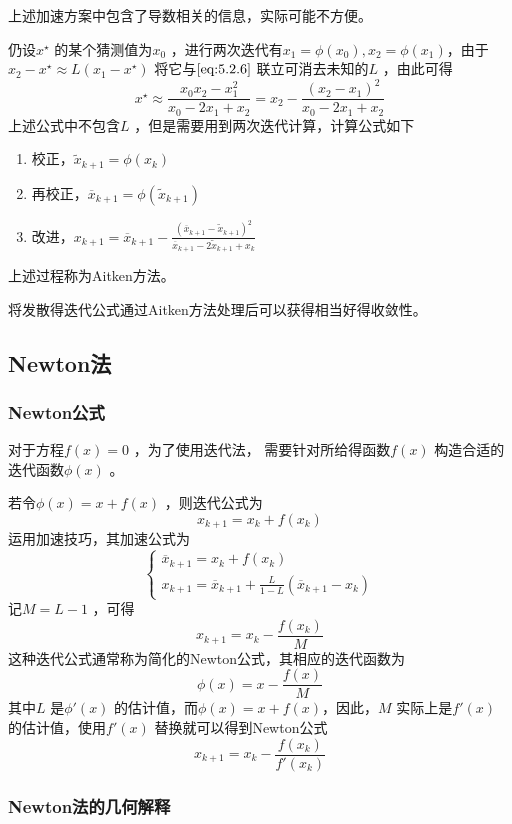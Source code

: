 \documentclass[a4paper]{article}
\begin{document}
上述加速方案中包含了导数相关的信息，实际可能不方便。

仍设$x^{\star}$ 的某个猜测值为$x_0$ ，进行两次迭代有$x_1 = \phi(x_0), x_2 = \phi(x_1)$，由于$x_2 - x^{\star} \approx L (x_1 - x^{\star})$ 将它与$\ref{eq:5.2.6}$ 联立可消去未知的$L$ ，由此可得
\[
x^{\star} \approx \frac{x_0 x_2 - x_1^2}{x_0 - 2 x_1 + x_2} = x_2 - \frac{(x_2 - x_1)^2}{x_0 - 2 x_1 + x_2}
\] 
上述公式中不包含$L$ ，但是需要用到两次迭代计算，计算公式如下
\begin{enumerate}
	\item 校正，$\tilde{x}_{k+1} = \phi(x_{k})$
	\item 再校正，$\overline{x}_{k+1} = \phi(\tilde{x}_{k+1})$
	\item 改进，$x_{k+1} = \overline{x}_{k+1} - \frac{(\overline{x}_{k+1} - \tilde{x}_{k+1})^2}{\overline{x}_{k+1} - 2 \tilde{x}_{k+1} + x_{k}}$
\end{enumerate}
上述过程称为Aitken方法。

将发散得迭代公式通过Aitken方法处理后可以获得相当好得收敛性。

\subsection{Newton法}
\subsubsection{Newton公式}
对于方程$f(x) = 0$ ，为了使用迭代法， 需要针对所给得函数$f(x)$ 构造合适的迭代函数$\phi(x)$ 。

若令$\phi(x) = x + f(x)$ ，则迭代公式为
\[
x_{k+1} = x_{k} + f(x_{k}) \tag{5.3.1} \label{eq:5.3.1} 
\] 
运用加速技巧，其加速公式为
\[
\begin{cases}
	\overline{x}_{k+1} = x_{k} + f(x_{k}) \\
	x_{k+1} = \overline{x}_{k+1} + \frac{L}{1 - L} (\overline{x}_{k+1} - x_{k})
\end{cases} 
\] 
记$M = L - 1$ ，可得
\[
x_{k+1} = x_{k} - \frac{f(x_{k})}{M}
\] 
这种迭代公式通常称为简化的Newton公式，其相应的迭代函数为
\[
\phi(x) = x - \frac{f(x)}{M} \tag{5.3.2} \label{eq:5.3.2} 
\] 
其中$L$ 是$\phi'(x)$ 的估计值，而$\phi(x) = x + f(x)$，因此，$M$ 实际上是$f'(x)$ 的估计值，使用$f'(x)$ 替换就可以得到Newton公式
\[
x_{k+1} = x_{k} - \frac{f(x_{k})}{f'(x_{k})} \tag{5.3.3} \label{eq:5.3.3} 
\] 

\subsubsection{Newton法的几何解释}
\end{document}
